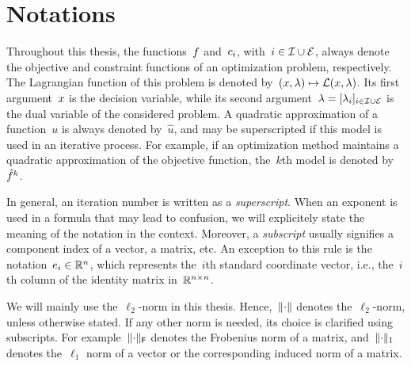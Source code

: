 \section{Notations}


Throughout this thesis, the functions~$f$ and~$c_{i}$, with~$i \in \mathcal{I} \cup \mathcal{E}$, always denote the objective and constraint functions of an optimization problem, respectively.
The Lagrangian function of this problem is denoted by~$(\iter, \lm) \mapsto \lag(\iter, \lm)$.
Its first argument~$\iter$ is the decision variable, while its second argument~$\lm = [\lm_i]_{i \in \iub \cup \ieq}$ is the dual variable of the considered problem.
A quadratic approximation of a function~$u$ is always denoted by~$\hat{u}$, and may be superscripted if this model is used in an iterative process.
For example, if an optimization method maintains a quadratic approximation of the objective function, the~$k$th model is denoted by~$\objm[k]$.

In general, an iteration number is written as a \emph{superscript}.
When an exponent is used in a formula that may lead to confusion, we will explicitely state the meaning of the notation in the context.
Moreover, a \emph{subscript} usually signifies a component index of a vector, a matrix, etc.
An exception to this rule is the notation~$e_i \in \mathbb{R}^n$, which represents the~$i$th standard coordinate vector, i.e., the~$i$th column of the identity matrix in~$\mathbb{R}^{n \times n}$.

We will mainly use the~$\ell_2$-norm in this thesis.
Hence,~$\lVert\cdot\rVert$ denotes the~$\ell_2$-norm, unless otherwise stated.
If any other norm is needed, its choice is clarified using subscripts.
For example~$\lVert\cdot\rVert_{\mathsf{F}}$ denotes the Frobenius norm of a matrix, and~$\lVert\cdot\rVert_1$ denotes the~$\ell_1$ norm of a vector or the corresponding induced norm of a matrix.
